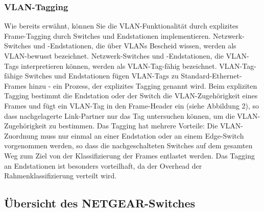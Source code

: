         \subsubsection{VLAN-Tagging}
        Wie bereits erwähnt, können Sie die VLAN-Funktionalität durch explizites Frame-Tagging 
        durch Switches und Endstationen implementieren. Netzwerk-Switches und -Endstationen, die 
        über VLANs Bescheid wissen, werden als VLAN-bewusst bezeichnet. Netzwerk-Switches und -Endstationen, die VLAN-Tags interpretieren können, werden als VLAN-Tag-fähig bezeichnet. VLAN-Tag-fähige Switches und Endstationen fügen VLAN-Tags zu Standard-Ethernet-Frames hinzu - ein Prozess, der explizites Tagging genannt wird. Beim expliziten Tagging bestimmt die Endstation oder der Switch die VLAN-Zugehörigkeit eines Frames und fügt ein VLAN-Tag in den Frame-Header ein (siehe Abbildung 2), so dass nachgelagerte Link-Partner nur das Tag untersuchen können, um die VLAN-Zugehörigkeit zu bestimmen.
        Das Tagging hat mehrere Vorteile: Die VLAN-Zuordnung muss nur einmal an einer Endstation oder an einem Edge-Switch vorgenommen werden, so dass die nachgeschalteten Switches auf dem gesamten Weg zum Ziel von der Klassifizierung der Frames entlastet werden. Das Tagging an Endstationen ist besonders vorteilhaft, da der Overhead der Rahmenklassifizierung verteilt wird.


    \newpage
    \subsection{Übersicht des NETGEAR-Switches}